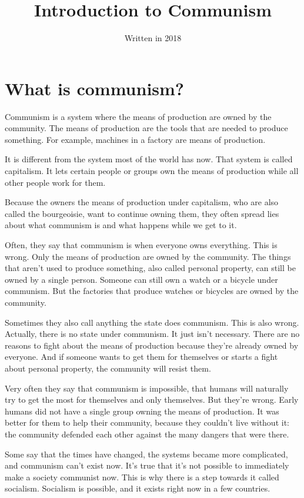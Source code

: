 \documentclass[a4paper]{book} %
\begin{document}
\fontsize{24}{28}\selectfont
\title{Introduction to Communism}
\date{Written in 2018}
\maketitle
\fontsize{24}{28}\selectfont
\chapter{What is communism?}
Communism is a system where the means of production are owned by the community. The means of production are the tools that are needed to produce something. For example, machines in a factory are means of production.

It is different from the system most of the world has now. That system is called capitalism. It lets certain people or groups own the means of production while all other people work for them.

Because the owners the means of production under capitalism, who are also called the bourgeoisie, want to continue owning them, they often spread lies about what communism is and what happens while we get to it.

Often, they say that communism is when everyone owns everything. This is wrong. Only the means of production are owned by the community. The things that aren't used to produce something, also called personal property, can still be owned by a single person. Someone can still own a watch or a bicycle under communism. But the factories that produce watches or bicycles are owned by the community.

Sometimes they also call anything the state does communism. This is also wrong. Actually, there is no state under communism. It just isn't necessary. There are no reasons to fight about the means of production because they're already owned by everyone. And if someone wants to get them for themselves or starts a fight about personal property, the community will resist them.

Very often they say that communism is impossible, that humans will naturally try to get the most for themselves and only themselves. But they're wrong. Early humans did not have a single group owning the means of production. It was better for them to help their community, because they couldn't live without it: the community defended each other against the many dangers that were there.

Some say that the times have changed, the systems became more complicated, and communism can't exist now. It's true that it's not possible to immediately make a society communist now. This is why there is a step towards it called socialism. Socialism is possible, and it exists right now in a few countries.
\end{document}
